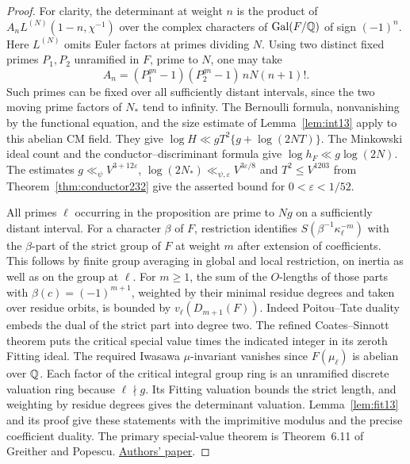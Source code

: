 \documentclass[a4paper,11pt]{article}
\theoremstyle{definition}
\theoremstyle{remark}
\numberwithin{equation}{section}
\begin{document}
\begin{proof}
For clarity, the determinant at weight \(n\) is the product of
\(A_n L^{(N)}(1-n,\chi^{-1})\) over the complex characters of
\(\operatorname{Gal}(F/\mathbb Q)\) of sign \((-1)^n\). Here \(L^{(N)}\)
omits Euler factors at primes dividing \(N\). Using two distinct
fixed primes \(P_1,P_2\) unramified in \(F\), prime to \(N\),
one may take
\[
 A_n=(P_1^{gn}-1)(P_2^{gn}-1)\,nN(n+1)! .
\]
Such primes can be fixed over all sufficiently distant intervals,
since the two moving prime factors of \(N_*\) tend to infinity.
The Bernoulli formula, nonvanishing by the functional equation,
and the size estimate of Lemma~\ref{lem:int13} apply to this
abelian CM field. They give
\(\log H\ll gT^2\{g+\log(2NT)\}\). The Minkowski ideal count
and the conductor--discriminant formula give
\(\log h_F\ll g\log(2N)\). The estimates
\(g\ll_\psi V^{3+12\varepsilon}\),
\(\log(2N_*)\ll_{\psi,\varepsilon}V^{3\varepsilon/8}\) and
\(T^2\le V^{1203}\) from Theorem~\ref{thm:conductor232}
give the asserted bound for \(0<\varepsilon<1/52\).

All primes \(\ell\) occurring in the proposition are prime to
\(Ng\) on a sufficiently distant interval. For a character
\(\beta\) of \(F\), restriction identifies
\(S(\beta^{-1}\kappa_\ell^{-m})\) with the \(\beta\)-part of the
strict group of \(F\) at weight \(m\) after extension of
coefficients. This follows by finite group averaging in global
and local restriction, on inertia as well as on the group at
\(\ell\). For \(m\ge1\), the sum of the \(O\)-lengths of those
parts with \(\beta(c)=(-1)^{m+1}\), weighted by their minimal
residue degrees and taken over residue orbits, is bounded by
\(v_\ell(D_{m+1}(F))\). Indeed Poitou--Tate duality embeds
the dual of the strict part into degree two. The refined
Coates--Sinnott theorem puts the critical special value times
the indicated integer in its zeroth Fitting ideal. The required
Iwasawa \(\mu\)-invariant vanishes since \(F(\mu_\ell)\) is
abelian over \(\mathbb Q\). Each factor of the critical integral group
ring is an unramified discrete valuation ring because
\(\ell\nmid g\). Its Fitting valuation bounds the strict
length, and weighting by residue degrees gives the determinant
valuation. Lemma~\ref{lem:fit13} and its proof give these
statements with the imprimitive modulus and the precise
coefficient duality. The primary special-value theorem is
Theorem~6.11 of Greither and Popescu.
\href{https://arxiv.org/abs/1103.3069}{Authors' paper}.


\end{proof}
\end{document}
